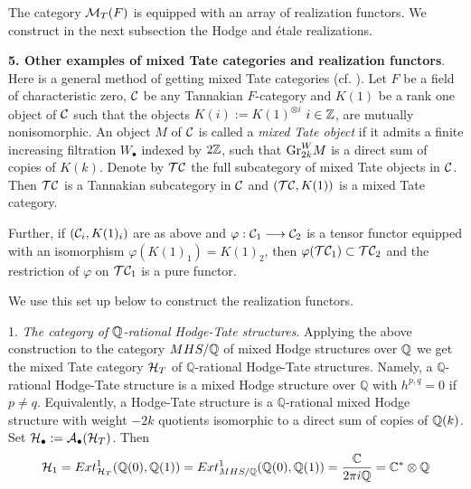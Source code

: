 \documentclass[10pt]{article}
\begin{document}
The category  ${\cal M}_T(F)$  is equipped with an array of realization functors. 
We construct in the next subsection  the Hodge and \'etale realizations. 



{\bf 5. Other examples of mixed Tate categories and realization functors}.  
Here is a general method of getting 
mixed Tate categories (cf. \cite{BD2}). Let $F$ be a field of characteristic zero, 
${\cal C}$ be any Tannakian $F$-category and $K(1)$ be a rank one object of ${\cal C}$ such 
that the objects $K(i):= K(1)^{\otimes i}$ $i \in {\mathbb Z}$, are mutually nonisomorphic. 
An object $M$ of ${\cal C}$ is called a {\it mixed Tate object} if it admits a finite 
increasing filtration $W_{\bullet}$ indexed by $2{\mathbb Z}$, such that ${\rm Gr}^W_{2k}M$ is a 
direct sum of copies of $K(k)$. Denote by ${\cal T}{\cal C}$ the full subcategory of 
mixed Tate objects in ${\cal C}$. Then 
${\cal T}{\cal C}$ is a Tannakian subcategory in ${\cal C}$ and $({\cal T}{\cal C}, K(1))$ 
is a mixed Tate category. 

Further, if $({\cal C}_i, K(1)_i)$ are as above and $\varphi: {\cal C}_1 \longrightarrow {\cal C}_2$ is a 
tensor functor equipped with an isomorphism $\varphi(K(1)_1) = K(1)_2$, then 
$\varphi({\cal T}{\cal C}_1) \subset  {\cal T}{\cal C}_2$ and the restriction of $\varphi$
on ${\cal T}{\cal C}_1$ is a pure functor. 

We use this set up below to construct the realization functors. 

1. {\it The category of ${\mathbb Q}$-rational Hodge-Tate structures}. Applying the above construction 
to the category $MHS/{\mathbb Q}$ of mixed Hodge structures over ${\mathbb Q}$ we get the mixed Tate category 
${\cal H}_T$ of $ \mathbb Q$-rational Hodge-Tate structures. Namely, 
a $ \mathbb Q$-rational Hodge-Tate structure is a mixed Hodge structure over $\mathbb Q$ 
with $h^{p,q} =0$ if $p \not = q$.  
Equivalently, a Hodge-Tate structure is a $ \mathbb Q$-rational mixed Hodge structure with 
weight $-2k$ quotients isomorphic to 
a direct sum of copies of ${\mathbb Q}(k)$. 
Set ${\cal H}_{\bullet}:= {\cal A}_{\bullet}({\cal H}_{T})$. Then 
\begin{equation} \label{8-24/99}
{\cal H}_1 = Ext^1_{{\cal H}_{T}}({\mathbb Q}(0),{\mathbb Q}(1))  = Ext^1_{MHS/{\mathbb Q}}({\mathbb Q}(0),{\mathbb Q}(1)) = \frac{{\mathbb C}}{2 \pi i {\mathbb Q}} = {\mathbb C}^*\otimes {{\mathbb Q}}
\end{equation}
 
\end{document}
